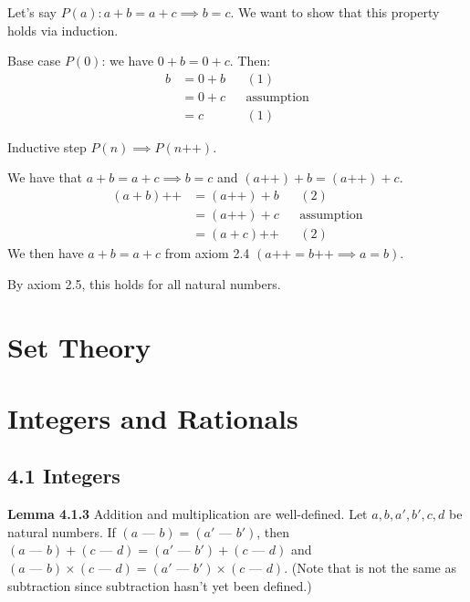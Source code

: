 \documentclass[answers,12pt]{exam}
\newcommand{\increment}{\text{++}}
\newcommand{\fakeminus}{\text{ --- }}
\begin{document}
\begin{solution}
    Let's say $P(a): a+b = a+c \implies b=c$.
    We want to show that this property holds via induction.

    Base case $P(0)$: we have $0+b=0+c$.
    Then:
    \begin{align*}
        b &= 0+b && (1) \\
        &= 0+c && \text{assumption} \\ 
        &= c && (1)
    \end{align*}

    Inductive step $P(n) \implies P(n \increment)$.

    We have that $a+b=a+c \implies b=c$ and $(a \increment) +b  = (a \increment) + c$.
    \begin{align*}
        (a + b) \increment &= (a \increment) + b && (2) \\
        &= (a \increment) + c && \text{assumption} \\ 
        &= (a+c) \increment && (2)
    \end{align*}
    We then have $a+b=a+c$ from axiom 2.4 $(a \increment = b \increment \implies a=b)$.

    By axiom 2.5, this holds for all natural numbers.
\end{solution}

\section{Set Theory}

\section{Integers and Rationals}
\subsection{4.1 Integers}
\textbf{Lemma 4.1.3} Addition and multiplication are well-defined.
Let $a,b,a',b',c,d$ be natural numbers.
If $(a \fakeminus b)=(a' \fakeminus b')$, then $(a \fakeminus b)+(c \fakeminus d)=(a' \fakeminus b')+(c \fakeminus d)$ and $(a \fakeminus b)\times(c \fakeminus d)=(a' \fakeminus b')\times(c \fakeminus d)$.
(Note that \fakeminus{} is not the same as subtraction since subtraction hasn't yet been defined.)
\end{document}
